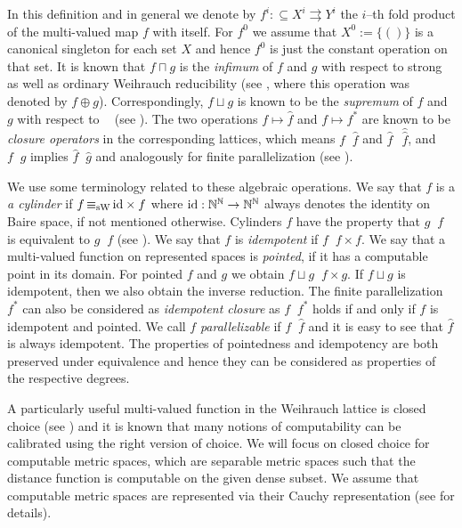 \documentclass[a4paper]{amsart}
\def\IN{{\mathbb{N}}}
\def\In{\subseteq}
\def\mto{\rightrightarrows}
\def\id{{\rm id}}
\def\Baire{{\IN^\IN}}
\def\leqW{\mathop{\leq_{\mathrm{W}}}}
\def\equivW{\mathop{\equiv_{\mathrm{W}}}}
\def\leqSW{\mathop{\leq_{\mathrm{sW}}}}
\def\equivSW{\mathop{\equiv_{\mathrm{sW}}}}
\theoremstyle{definition}
\begin{document}
In this definition and in general we denote by $f^i:\In X^i\mto Y^i$ the $i$--th fold product
of the multi-valued map $f$ with itself. For $f^0$ we assume that $X^0:=\{()\}$ is a canonical
singleton for each set $X$ and hence $f^0$ is just the constant operation on that set.
It is known that $f\sqcap g$ is the {\em infimum} of $f$ and $g$ with respect to strong as well as
ordinary Weihrauch reducibility (see \cite{BG11}, where this operation was denoted by $f\oplus g$).
Correspondingly, $f\sqcup g$ is known to be the {\em supremum} of $f$ and $g$ with respect to $\leqW$ (see \cite{Pau09}).
The two operations $f\mapsto\widehat{f}$ and $f\mapsto f^*$ are known to be {\em closure operators}
in the corresponding lattices, which means
$f \leqW \widehat{f}$ and $\widehat{f} \equivW\,\widehat{\!\!\widehat{f}}$, and $f \leqW g$ implies $\widehat{f} \leqW \widehat{g}$
and analogously for finite parallelization (see \cite{BG11,Pau09}).

We use some terminology related to these algebraic operations. 
We say that $f$ is a {\em a cylinder} if $f\equivSW\id\times f$ where $\id:\Baire\to\Baire$ always
denotes the identity on Baire space, if not mentioned otherwise. 
Cylinders $f$ have the property that $g\leqW f$ is equivalent to $g\leqSW f$ (see \cite{BG11}).
We say that $f$ is {\em idempotent} if $f\equivW f\times f$.
We say that a multi-valued function on represented spaces is {\em pointed}, if it has a computable
point in its domain. For pointed $f$ and $g$ we obtain $f\sqcup g\leqSW f\times g$. 
If $f\sqcup g$ is idempotent, then we also obtain the inverse reduction. 
The finite parallelization $f^*$ can also be considered as {\em idempotent closure} as 
$f\equivW f^*$ holds if and only if $f$ is idempotent and pointed. 
We call $f$ {\em parallelizable} if $f\equivW\widehat{f}$ and it is easy to see that $\widehat{f}$ is always idempotent.
The properties of pointedness and idempotency are both preserved under
equivalence and hence they can be considered as properties of the respective degrees.

A particularly useful multi-valued function in the Weihrauch lattice is closed choice (see \cite{GM09,BG11,BG11a,BBP12})
and it is known that many notions of computability can be calibrated using the right version of choice. 
We will focus on closed choice for computable metric spaces, which are separable metric spaces
such that the distance function is computable on the given dense subset.
We assume that computable metric spaces are represented via their Cauchy representation
(see \cite{Wei00} for details).
\end{document}
